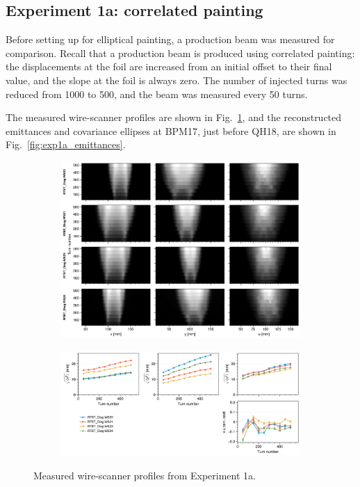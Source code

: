 \subsection{Experiment 1a: correlated painting}

Before setting up for elliptical painting, a production beam was measured for comparison. Recall that a production beam is produced using correlated painting: the displacements at the foil are increased from an initial offset to their final value, and the slope at the foil is always zero. The number of injected turns was reduced from 1000 to 500, and the beam was measured every 50 turns. 

The measured wire-scanner profiles are shown in Fig.~\ref{fig:exp1a_wsmeas}, and the reconstructed emittances and covariance ellipses at BPM17, just before QH18, are shown in Fig.~\ref{fig:exp1a_emittances}.
%
\begin{figure}[!p]
    \centering
    \begin{subfigure}{\textwidth}
        \includegraphics[width=\textwidth]{Images/chapter5/exp1a/waterfall.png}
    \end{subfigure}
    \vfill
    \vspace*{1.25cm}
    \vfill
    \begin{subfigure}{\textwidth}
        \includegraphics[width=\textwidth]{Images/chapter5/exp1a/rms.png}
    \end{subfigure}
    \caption{Measured wire-scanner profiles from Experiment 1a.}
    \label{fig:exp1a_wsmeas}
\end{figure}
